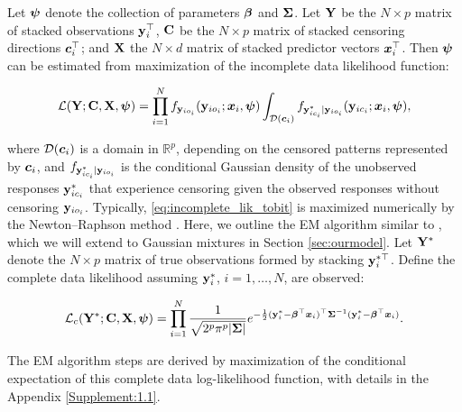 \documentclass{interact}
\theoremstyle{plain}
\theoremstyle{definition}
\theoremstyle{remark}
\begin{document}
Let $\bm{\psi}$ denote the collection of parameters ${\bm \beta}$ and $\bm{\Sigma}$. Let $\mathbf{Y}$ be the $N \times p$ matrix of stacked observations $\mathbf{y}_i^\top$, $\mathbf{C}$ be the $N \times p$ matrix of stacked censoring directions $\bm{c}_i^\top$; and $\mathbf{X}$ the $N \times d$ matrix of stacked predictor vectors $\bm{x}_i^\top$. Then $\bm{\psi}$ can be estimated from maximization of the incomplete data likelihood function:
\begin{linenomath}
\begin{align}
    \mathcal{L}(\mathbf{Y};\mathbf{C},\mathbf{X},\bm{\psi})=\prod_{i=1}^Nf_{\mathbf{y}_{io_{i}}}(\mathbf{y}_{io_{i}};\bm{x}_i, \bm{\psi})\int_{\mathcal{D}(\bm{c}_i)} f_{\mathbf{y}_{ic_{i}}^*|\mathbf{y}_{io_{i}}}(\mathbf{y}_{ic_{i}};\bm{x}_i,\bm{\psi}),\label{eq:incomplete_lik_tobit}
\end{align}
\end{linenomath}
where $\mathcal{D}(\bm{c}_i)$ is a domain in $\mathbb{R}^p$, depending on the censored patterns represented by $\bm{c}_{i}$, and $f_{\mathbf{y}_{ic_i}^*|\mathbf{y}_{io_i}}$ is the conditional Gaussian density of the unobserved responses $\mathbf{y}_{ic_i}^*$ that experience censoring given the observed responses without censoring $\mathbf{y}_{io_i}$. Typically, \eqref{eq:incomplete_lik_tobit} is maximized numerically by the Newton–Raphson method \citep{Amemiya1973}. Here, we outline the EM algorithm similar to \citep{Fair1977,Ruud1991}, which we will extend to Gaussian mixtures in Section \ref{sec:ourmodel}. Let $\mathbf{Y}^*$ denote the $N \times p$ matrix of true observations formed by stacking $\mathbf{y}_i^{*\top}$. Define the complete data likelihood assuming $\mathbf{y}_i^*$, $i=1,\dots,N$, are observed:
\begin{linenomath}
\begin{align*}
    \mathcal{L}_c(\mathbf{Y}^*;\mathbf{C},\mathbf{X},\bm{\psi})=\prod_{i=1}^N\frac{1}{\sqrt{2^p\pi^p|\bm{\Sigma}|}}e^{-\frac{1}{2}(\mathbf{y}_i^*-{\bm \beta}^\top\bm{x}_i)^\top\bm{\Sigma}^{-1}(\mathbf{y}_i^*-{\bm \beta}^\top\bm{x}_i)}.
\end{align*}
\end{linenomath}
The EM algorithm steps are derived by maximization of the conditional expectation of this complete data log-likelihood function, with details in the Appendix \ref{Supplement:1.1}.
\end{document}
